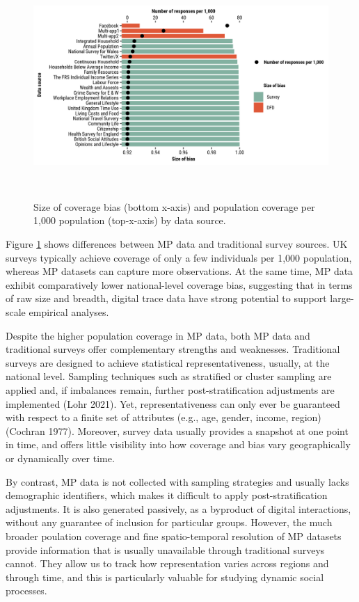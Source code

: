 \documentclass{article}
\begin{document}
\begin{figure}
\centering
\includegraphics[width=14cm,height=8.5cm]{figures/compare-surveys-two-axis.png}
\caption{Size of coverage bias (bottom x-axis) and population coverage per
1,000 population (top-x-axis) by data
source.}\label{fig:survey}
\end{figure}

Figure \ref{fig:survey} shows differences between MP data and
traditional survey sources. UK surveys typically achieve coverage of
only a few individuals per 1,000 population, whereas MP datasets can
capture more observations. At the same time, MP data exhibit
comparatively lower national-level coverage bias, suggesting that in
terms of raw size and breadth, digital trace data have strong potential
to support large-scale empirical analyses.

Despite the higher population coverage in MP data, both MP data and
traditional surveys offer complementary strengths and weaknesses.
Traditional surveys are designed to achieve statistical
representativeness, usually, at the national level. Sampling techniques
such as stratified or cluster sampling are applied and, if imbalances
remain, further post-stratification adjustments are implemented
(Lohr 2021). Yet, representativeness can only ever be guaranteed with
respect to a finite set of attributes (e.g., age, gender, income,
region) (Cochran 1977). Moreover, survey data usually provides a
snapshot at one point in time, and offers little visibility into how
coverage and bias vary geographically or dynamically over time.

By contrast, MP data is not collected with sampling strategies and
usually lacks demographic identifiers, which makes it difficult to apply
post-stratification adjustments. It is also generated passively, as a
byproduct of digital interactions, without any guarantee of inclusion
for particular groups. However, the much broader poulation coverage and
fine spatio-temporal resolution of MP datasets provide information that
is usually unavailable through traditional surveys cannot. They allow us
to track how representation varies across regions and through time, and
this is particularly valuable for studying dynamic social processes.
\end{document}
